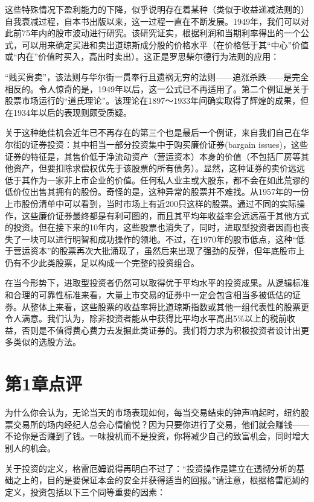 \documentclass[12pt,oneside]{book}
\begin{document}
这些特殊情况下盈利能力的下降，似乎说明存在着某种（类似于收益递减法则的）自我衰减过程，自本书出版以来，这一过程一直在不断发展。1949年，我们可以对此前75年内的股市波动进行研究。该研究证实，根据利润和当期利率得出的一个公式，可以用来确定买进和卖出道琼斯成分股的价格水平（在价格低于其“中心”价值或“内在”价值时买入，高出时卖出）。这正是罗思柴尔德行为法则的应用：

“贱买贵卖”，该法则与华尔街一贯奉行且遗祸无穷的法则——追涨杀跌——是完全相反的。令人惊奇的是，1949年以后，这一公式已不再适用了。第二个例证是关于股票市场运行的“道氏理论”。该理论在1897～1933年间确实取得了辉煌的成果，但在1934年以后的表现则颇受质疑。

关于这种绝佳机会近年已不再存在的第三个也是最后一个例证，来自我们自己在华尔街的证券投资：其中相当一部分投资集中于购买廉价证券(bargain issues)，这些证券的特征是，其售价低于净流动资产（营运资本）本身的价值（不包括厂房等其他资产，但要扣除求偿权优先于该股票的所有债务）。显然，这种证券的卖价远远低于其作为一家非上市企业的价值。任何私人业主或大股东，都不会在如此荒谬的低价位出售其拥有的股份。奇怪的是，这种异常的股票并不难找。从1957年的一份上市股份清单中可以看到，当时市场上有近200只这样的股票。通过不同的实际操作，这些廉价证券最终都是有利可图的，而且其平均年收益率会远远高于其他方式的投资。但在接下来的10年内，这些股票也消失了，同时，进取型投资者因而也丧失了一块可以进行明智和成功操作的领地。不过，在1970年的股市低点，这种“低于营运资本”的股票再次大批涌现了，虽然后来出现了强劲的反弹，但年底股市上仍有不少此类股票，足以构成一个完整的投资组合。

在当今形势下，进取型投资者仍然可以取得优于平均水平的投资成果。从逻辑标准和合理的可靠性标准来看，大量上市交易的证券中一定会包含相当多被低估的证券。从整体上来看，这些股票的收益率将比道琼斯指数或其他一组代表性的股票更令人满意。我们认为，除非投资者能从中获得比平均水平高出5\%以上的税前收益，否则是不值得费心费力去发掘此类证券的。我们将力求为积极投资者设计出更多类似的选股方法。





\section{第1章点评}
为什么你会认为，无论当天的市场表现如何，每当交易结束的钟声响起时，纽约股票交易所的场内经纪人总会心情愉悦？因为只要你进行了交易，他们就会赚钱——不论你是否赚到了钱。一味投机而不是投资，你将减少自己的致富机会，同时增大别人的机会。

关于投资的定义，格雷厄姆说得再明白不过了：“投资操作是建立在透彻分析的基础之上的，目的是要保证本金的安全并获得适当的回报。”请注意，根据格雷厄姆的定义，投资包括以下三个同等重要的因素：
\end{document}
